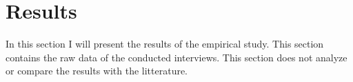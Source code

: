 
\chapter{Results}
\label{chapter:empirical}

In this section I will present the results of the empirical study. This section contains the raw data of the conducted interviews. This section does not analyze or compare the results with the litterature.
